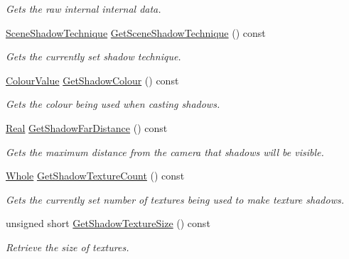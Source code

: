 \begin{DoxyCompactItemize}
\begin{DoxyCompactList}\small\item\em Gets the raw internal internal data. \item\end{DoxyCompactList}\item 
\hyperlink{classphys_1_1SceneManager_a427f1bbb52c11ad07352ae01d8b3c746}{SceneShadowTechnique} \hyperlink{classphys_1_1SceneManager_a29cb7b20fb3b64b95bd951d65ffe8bca}{GetSceneShadowTechnique} () const 
\begin{DoxyCompactList}\small\item\em Gets the currently set shadow technique. \item\end{DoxyCompactList}\item 
\hyperlink{classphys_1_1ColourValue}{ColourValue} \hyperlink{classphys_1_1SceneManager_ab008f05d80ca7e8fa7df3ab4e621173f}{GetShadowColour} () const 
\begin{DoxyCompactList}\small\item\em Gets the colour being used when casting shadows. \item\end{DoxyCompactList}\item 
\hyperlink{namespacephys_af7eb897198d265b8e868f45240230d5f}{Real} \hyperlink{classphys_1_1SceneManager_a496228d09b1ee83a6d476565cc334f3b}{GetShadowFarDistance} () const 
\begin{DoxyCompactList}\small\item\em Gets the maximum distance from the camera that shadows will be visible. \item\end{DoxyCompactList}\item 
\hyperlink{namespacephys_a460f6bc24c8dd347b05e0366ae34f34a}{Whole} \hyperlink{classphys_1_1SceneManager_ac5b37e84f72853b4705f164919e2daa3}{GetShadowTextureCount} () const 
\begin{DoxyCompactList}\small\item\em Gets the currently set number of textures being used to make texture shadows. \item\end{DoxyCompactList}\item 
unsigned short \hyperlink{classphys_1_1SceneManager_a0ed48ad404c48c492130f8f3f5eb2b26}{GetShadowTextureSize} () const 
\begin{DoxyCompactList}\small\item\em Retrieve the size of textures. \item\end{DoxyCompactList}\item 

\end{DoxyCompactItemize}
